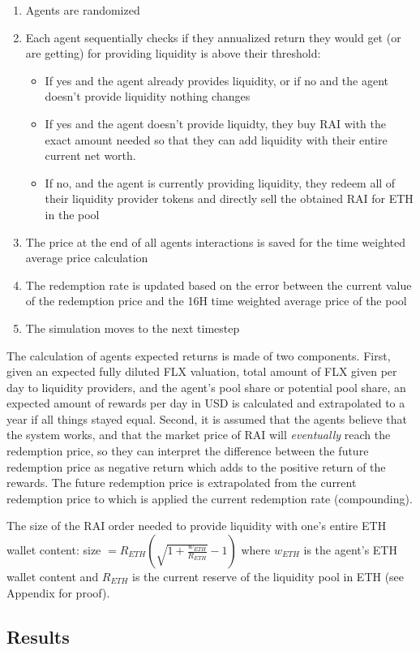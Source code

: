 \documentclass{article}
\begin{document}
    \begin{enumerate}
      \item Agents are randomized
      \item Each agent sequentially checks if they annualized return they would get (or are getting) for providing liquidity is above their threshold:
        \begin{itemize}
          \item If yes and the agent already provides liquidity, or if no and the agent doesn't provide liquidity nothing changes
          \item If yes and the agent doesn't provide liquidty, they buy RAI with the exact amount needed so that they can add liquidity with their entire current net worth. 
          \item If no, and the agent is currently providing liquidity, they redeem all of their liquidity provider tokens and directly sell the obtained RAI for ETH in the pool
        \end{itemize}
      \item The price at the end of all agents interactions is saved for the time weighted average price calculation
      \item The redemption rate is updated based on the error between the current value of the redemption price and the 16H time weighted average price of the pool
      \item The simulation moves to the next timestep
    \end{enumerate}

    The calculation of agents expected returns is made of two components. First, given an expected fully diluted FLX valuation, total amount of FLX given per day to liquidity providers, and the agent's pool share or potential pool share, an expected amount of rewards per day in USD is calculated and extrapolated to a year if all things stayed equal. Second, it is assumed that the agents believe that the system works, and that the market price of RAI will \textit{eventually} reach the redemption price, so they can interpret the difference between the future redemption price as negative return which adds to the positive return of the rewards. The future redemption price is extrapolated from the current redemption price to which is applied the current redemption rate (compounding). 

    The size of the RAI order needed to provide liquidity with one's entire ETH wallet content: size $ = R_{ETH}\left( \sqrt{1 + \frac{w_{ETH}}{R_{ETH}}} - 1 \right)$ where $w_{ETH}$ is the agent's ETH wallet content and $R_{ETH}$ is the current reserve of the liquidity pool in ETH (see Appendix for proof).

    \subsection{Results}
\end{document}
